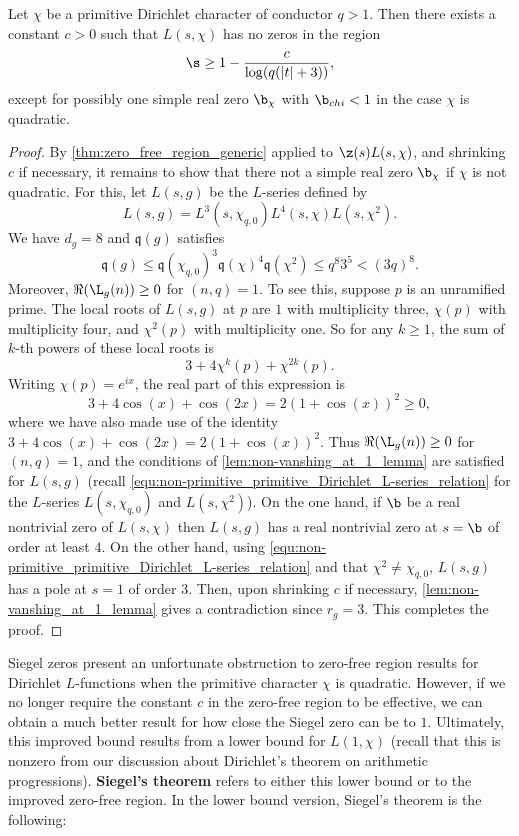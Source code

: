     \begin{theorem}\label{thm:improved_zero-free_region_Dirichlet}
      Let $\chi$ be a primitive Dirichlet character of conductor $q > 1$. Then there exists a constant $c > 0$ such that $L(s,\chi)$ has no zeros in the region
      \[
        \s \ge 1-\frac{c}{\log(q(|t|+3))},
      \]
      except for possibly one simple real zero $\b_{\chi}$ with $\b_{chi} < 1$ in the case $\chi$ is quadratic.
    \end{theorem}
    \begin{proof}
      By \cref{thm:zero_free_region_generic} applied to $\z(s)L(s,\chi)$, and shrinking $c$ if necessary, it remains to show that there not a simple real zero $\b_{\chi}$ if $\chi$ is not quadratic. For this, let $L(s,g)$ be the $L$-series defined by
      \[
        L(s,g) = L^{3}(s,\chi_{q,0})L^{4}(s,\chi)L(s,\chi^{2}).
      \]
      We have $d_{g} = 8$ and $\mathfrak{q}(g)$ satisfies
      \[
        \mathfrak{q}(g) \le \mathfrak{q}(\chi_{q,0})^{3}\mathfrak{q}(\chi)^{4}\mathfrak{q}(\chi^{2}) \le q^{8}3^{5} < (3q)^{8}.
      \]
      Moreover, $\Re(\L_{g}(n)) \ge 0$ for $(n,q) = 1$. To see this, suppose $p$ is an unramified prime. The local roots of $L(s,g)$ at $p$ are $1$ with multiplicity three, $\chi(p)$ with multiplicity four, and $\chi^{2}(p)$ with multiplicity one. So for any $k \ge 1$, the sum of $k$-th powers of these local roots is
      \[
        3+4\chi^{k}(p)+\chi^{2k}(p).
      \]
      Writing $\chi(p) = e^{ix}$, the real part of this expression is
      \[
        3+4\cos(x)+\cos(2x) = 2(1+\cos(x))^{2} \ge 0,
      \]
      where we have also made use of the identity $3+4\cos(x)+\cos(2x) = 2(1+\cos(x))^{2}$. Thus $\Re(\L_{g}(n)) \ge 0$ for $(n,q) = 1$, and the conditions of \cref{lem:non-vanshing_at_1_lemma} are satisfied for $L(s,g)$ (recall \cref{equ:non-primitive_primitive_Dirichlet_L-series_relation} for the $L$-series $L(s,\chi_{q,0})$ and $L(s,\chi^{2})$). On the one hand, if $\b$ be a real nontrivial zero of $L(s,\chi)$ then $L(s,g)$ has a real nontrivial zero at $s = \b$ of order at least $4$. On the other hand, using \cref{equ:non-primitive_primitive_Dirichlet_L-series_relation} and that $\chi^{2} \neq \chi_{q,0}$, $L(s,g)$ has a pole at $s = 1$ of order $3$. Then, upon shrinking $c$ if necessary, \cref{lem:non-vanshing_at_1_lemma} gives a contradiction since $r_{g} = 3$. This completes the proof.
    \end{proof}

    Siegel zeros present an unfortunate obstruction to zero-free region results for Dirichlet $L$-functions when the primitive character $\chi$ is quadratic. However, if we no longer require the constant $c$ in the zero-free region to be effective, we can obtain a much better result for how close the Siegel zero can be to $1$. Ultimately, this improved bound results from a lower bound for $L(1,\chi)$ (recall that this is nonzero from our discussion about Dirichlet's theorem on arithmetic progressions). \textbf{Siegel's theorem} refers to either this lower bound or to the improved zero-free region. In the lower bound version, Siegel's theorem is the following:

